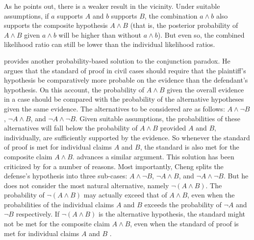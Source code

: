 \documentclass{article}
\begin{document}
%
As he points out, there is a weaker result in the vicinity. 
 Under suitable assumptions, if $a$  supports $A$ and $b$ supports   $B$, the combination $a \wedge b$ also  supports the composite hypothesis $A\wedge B$ (that is, the posterior probability of $A\wedge B$ given $a \wedge b$ will be higher than without $a \wedge b$). But even so, the combined likelihood ratio can still be lower than the individual likelihood ratios.
 
 



\cite{cheng2012reconceptualizing} provides another probability-based solution to the conjunction paradox. He argues that the standard of proof in civil cases should require that the plaintiff's hypothesis be comparatively more probable on the evidence than the defendant's hypothesis. %
 On this account, the probability of $A\wedge B$ given the overall evidence in a case should be compared with the probability of the alternative hypotheses given the same evidence. The alternatives to be considered  are as follows: $A\wedge \neg B$, $\neg A \wedge B$, and $\neg A \wedge \neg B$. Given suitable assumptions, the probabilities of these alternatives will fall below the probability of $A\wedge B$ provided $A$ and $B$, individually, are sufficiently supported by the evidence. So whenever the standard of proof is met for individual claims $A$ and $B$, the standard is also met for the composite claim $A \wedge B$. \citet{kaplow2014likelihood} 
advances a similar argument.  
  This solution has been criticized by \citet{Urbaniak2019standards2} for a number of reasons. %
 Most importantly, Cheng splits the defense's hypothesis into three sub-cases: $A\wedge \neg B$, $\neg A \wedge B$, and $\neg A \wedge \neg B$. But he does not consider the most natural alternative, namely $\neg (A \wedge B)$. 
 The probability of $\neg (A \wedge B)$ may actually exceed that of 
 $A\wedge B$, even when the probabilities of the 
 individual claims $A$ and $B$ exceeds the probability of $\neg A$ and $\neg B$ respectively. If $\neg (A \wedge B)$ is the alternative hypothesis, the standard might not be met for the composite claim $A \wedge B$,   
 even when the standard of proof is met for individual claims $A$ and $B$ \citep[for a more general critique of Cheng's approach, see also][]{allen2013}.
 
\end{document}
